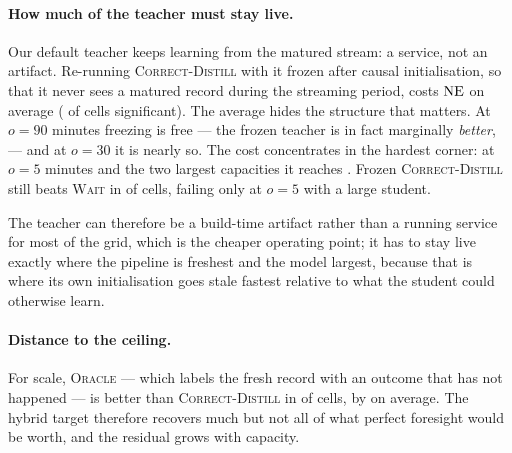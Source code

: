 \paragraph{How much of the teacher must stay live.}
Our default teacher keeps learning from the matured stream: a service, not an artifact.
Re-running \textsc{Correct-Distill} with it frozen after causal initialisation, so that it never
sees a matured record during the streaming period, costs \frzMean{} $\mathrm{NE}$ on average
(\frzSig{} of \nContrast{} cells significant). The
average hides the structure that matters. At $o=90$ minutes freezing is free --- the frozen
teacher is in fact marginally \emph{better}, \frzNinety{} --- and at $o=30$ it is nearly so. The
cost concentrates in the hardest corner: at $o=5$ minutes and the two largest capacities it
reaches \frzFiveLarge{}. Frozen \textsc{Correct-Distill} still beats \textsc{Wait} in
\frzWaitBeat{} of \frzWaitN{} cells, failing only at $o=5$ with a large student.

The teacher can therefore be a build-time artifact rather than a running service for most of
the grid, which is the cheaper operating point; it has to stay live exactly where the pipeline
is freshest and the model largest, because that is where its own initialisation goes stale
fastest relative to what the student could otherwise learn.

\paragraph{Distance to the ceiling.}
For scale, \textsc{Oracle} --- which labels the fresh record with an outcome that has not
happened --- is better than \textsc{Correct-Distill} in \cdOracleBeat{} of \cdOracleN{} cells,
by \cdOracleMean{} on average. The hybrid target therefore recovers much but not all of what
perfect foresight would be worth, and the residual grows with capacity.
